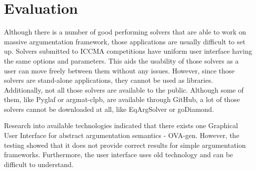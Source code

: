 \section{Evaluation}
Although there is a number of good performing solvers that are able to work on massive argumentation framework, those applications are usually difficult to set up. Solvers submitted to ICCMA competitions have uniform user interface having the same options and parameters. This aids the usability of those solvers as a user can move freely between them without any issues. However, since those solvers are stand-alone applications, they cannot be used as libraries. Additionally, not all those solvers are available to the public. Although some of them, like Pyglaf or argmat-clpb, are available through GitHub, a lot of those solvers cannot be downloaded at all, like EqArgSolver or goDiamond.


Research into available technologies indicated that there exists one Graphical User Interface for abstract argumentation semantics - OVA-gen. However, the testing showed that it does not provide correct results for simple argumentation frameworks. Furthermore, the user interface uses old technology and can be difficult to understand.